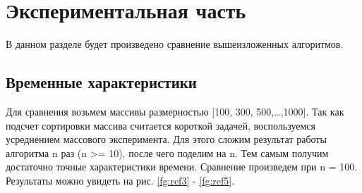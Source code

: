 \chapter{Экспериментальная часть}

В данном разделе будет произведено сравнение вышеизложенных алгоритмов.

\section{Временные характеристики}

Для сравнения возьмем массивы размерностью [100, 300, 500,\dots,1000]. 
Так как подсчет сортировки массива считается короткой задачей, воспользуемся усреднением массового эксперимента. 
Для этого сложим результат работы алгоритма n раз (n >= 10), после чего поделим на n. 
Тем самым получим достаточно точные характеристики времени. 
Сравнение произведем при n = 100.
Результаты можно увидеть на рис. \ref{fg:ref3} - \ref{fg:ref5}. 

\begin{figure}[ht!]
\end{figure}

